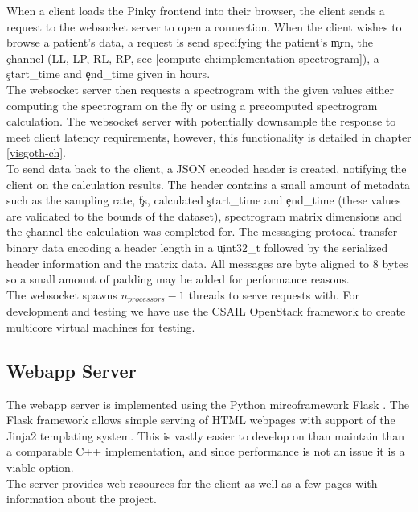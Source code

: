 When a client loads the Pinky frontend into their browser, the client sends a
request to the websocket server to open a connection. When the client wishes to
browse a patient's data, a request is send specifying the patient's \c{mrn},
the \c{channel} (LL, LP, RL, RP, see
\ref{compute-ch:implementation-spectrogram}), a \c{start\_time} and \c{end\_time}
given in hours. \\

The websocket server then requests a spectrogram with the given values either
computing the spectrogram on the fly or using a precomputed spectrogram
calculation. The websocket server with potentially downsample the response to
meet client latency requirements, however, this functionality is detailed in
chapter \ref{visgoth-ch}. \\

To send data back to the client, a JSON encoded header is created, notifying
the client on the calculation results. The header contains a small amount of
metadata such as the sampling rate, \c{fs}, calculated \c{start\_time} and
\c{end\_time} (these values are validated to the bounds of the dataset),
spectrogram matrix dimensions and the \c{channel} the calculation was completed
for. The messaging protocal transfer binary data encoding a header length in a
\c{uint32\_t} followed by the serialized header information and the matrix data.
All messages are byte aligned to 8 bytes so a small amount of padding may be
added for performance reasons. \\

The websocket spawns $n_{processors} - 1$ threads to serve requests with. For
development and testing we have use the CSAIL OpenStack framework to create
multicore virtual machines for testing.

\subsection{Webapp Server}\label{compute-ch:implementation-webapp}

The webapp server is implemented using the Python mircoframework Flask
\cite{flask}. The Flask framework allows simple serving of HTML webpages with
support of the Jinja2 \cite{jinja2} templating system. This is vastly easier to
develop on than maintain than a comparable C++ implementation, and since
performance is not an issue it is a viable option. \\

The server provides web resources for the client as well as a few pages with
information about the project.

